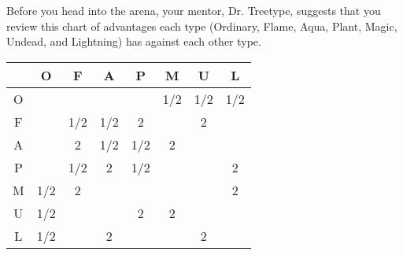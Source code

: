 

Before you head into the arena, your \mappMobimon{} mentor, Dr. Treetype,
suggests that you review this chart of advantages each \mappMobimon{} type
(Ordinary, Flame, Aqua, Plant, Magic, Undead, and Lightning) has against
each other type.

\begin{center}
\begin{tabular}{c|c|c|c|c|c|c|c|}
     &  O  &  F  &  A  &  P  &  M  &  U  &  L  \\\hline
  O  &     &     &     &     & 1/2 & 1/2 & 1/2 \\\hline
  F  &     & 1/2 & 1/2 &  2  &     &  2  &     \\\hline
  A  &     &  2  & 1/2 & 1/2 &  2  &     &     \\\hline
  P  &     & 1/2 &  2  & 1/2 &     &     &  2  \\\hline
  M  & 1/2 &  2  &     &     &     &     &  2  \\\hline
  U  & 1/2 &     &     &  2  &  2  &     &     \\\hline
  L  & 1/2 &     &  2  &     &     &  2  &     \\\hline
\end{tabular}
\end{center}



